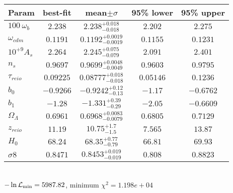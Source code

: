\begin{tabular}{|l|c|c|c|c|} 
 \hline 
Param & best-fit & mean$\pm\sigma$ & 95\% lower & 95\% upper \\ \hline 
$100~\omega_{b }$ &$2.238$ & $2.238_{-0.018}^{+0.018}$ & $2.202$ & $2.275$ \\ 
$\omega_{cdm }$ &$0.1191$ & $0.1192_{-0.0019}^{+0.0019}$ & $0.1155$ & $0.1231$ \\ 
$10^{+9}A_{s }$ &$2.264$ & $2.245_{-0.079}^{+0.075}$ & $2.091$ & $2.401$ \\ 
$n_{s }$ &$0.9697$ & $0.9699_{-0.0049}^{+0.0048}$ & $0.9603$ & $0.9795$ \\ 
$\tau_{reio }$ &$0.09225$ & $0.08777_{-0.018}^{+0.018}$ & $0.05146$ & $0.1236$ \\ 
$b_{0 }$ &$-0.9266$ & $-0.9242_{-0.13}^{+0.12}$ & $-1.17$ & $-0.6762$ \\ 
$b_{1 }$ &$-1.28$ & $-1.331_{-0.29}^{+0.39}$ & $-2.05$ & $-0.6609$ \\ 
$\Omega_{\Lambda }$ &$0.6961$ & $0.6968_{-0.0079}^{+0.0083}$ & $0.6805$ & $0.7129$ \\ 
$z_{reio }$ &$11.19$ & $10.75_{-1.5}^{+1.7}$ & $7.565$ & $13.87$ \\ 
$H_{0 }$ &$68.24$ & $68.35_{-0.79}^{+0.77}$ & $66.81$ & $69.93$ \\ 
$\sigma8$ &$0.8471$ & $0.8453_{-0.019}^{+0.019}$ & $0.808$ & $0.8823$ \\ 
\hline 
 \end{tabular} \\ 
$-\ln{\cal L}_\mathrm{min} =5987.82$, minimum $\chi^2=1.198e+04$ \\ 
